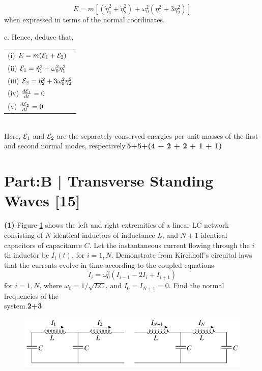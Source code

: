 \documentclass[12pt, a4paper]{article}
\begin{document}
{\begin{equation*}
    E= m[(\dot{\eta}_1^2+\dot{\eta}_2^2) + \omega_0^2(\eta_1^2+3\eta_2^2)]
\end{equation*} 
when expressed in terms of the normal coordinates.

c. Hence, deduce that,

\hspace{2cm}
\begin{tabular}{l}
        (i) $E = m({\cal E}_1+{\cal E}_2)$\\
        (ii) ${\cal E}_1 = \dot{\eta}_{1}^{2} + \omega_{0}^{2} \eta_{1}^{2}$\\
        (iii) ${\cal E}_2 =\dot{\eta}_{2}^{2} + 3\omega_{0}^{2} \eta_{2}^{2}$\\
        (iv) $\frac{d{\cal E}_1}{dt}=0$\\
        (v) $\frac{d{\cal E}_2}{dt} =0$
\end{tabular}\\
Here, ${\cal E}_1$ and ${\cal E}_2$ are the separately conserved energies per unit masses of the 
first and second normal modes, respectively.\hfill \textbf{5+5+(4 + 2 + 2 + 1 + 1)}\\

\noindent

\section*{Part:B | Transverse Standing Waves \hfill \textbf{[15]}}

\textbf{(1)} Figure-\ref{fig:LC-chain} shows the left and right extremities of a linear LC 
network consisting of $N$ identical inductors of inductance $L$, and $N+1$ identical 
capacitors of capacitance $C$. Let the instantaneous current flowing through the $i$th 
inductor be $I_i(t)$, for $i=1,N$. Demonstrate from Kirchhoff's circuital laws that the 
currents evolve in time according to the coupled equations
\begin{equation*}
    \ddot{I}_i = \omega_{0}^{2} (I_{i-1} -2I_{i} + I_{i+1})
\end{equation*}
for $i=1,N$, where $\omega_0=1/\sqrt{LC}$, and $I_0=I_{N+1}=0$. Find the normal frequencies 
of the\\ system.\hfill \textbf{2+3}
\begin{figure}[h]
    \centering
    \includegraphics[scale=0.4]{figs/LC-chain.png}
    \caption{}
    \label{fig:LC-chain}
\end{figure}\\

}
\end{document}
